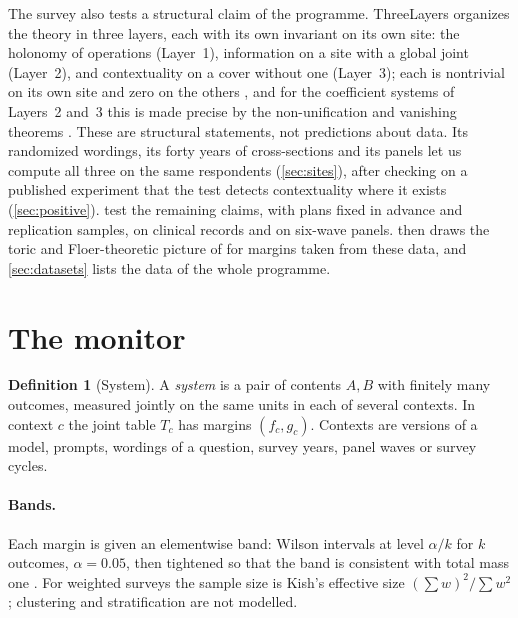 \documentclass[11pt]{article}
\theoremstyle{definition}
\newtheorem{definition}[theorem]{Definition}
\theoremstyle{remark}
\begin{document}
The survey also tests a structural claim of the programme. ThreeLayers \cite{ThreeLayers} organizes the theory in three layers, each with
its own invariant on its own site: the holonomy of operations (Layer~1), information on a site with a global joint (Layer~2), and
contextuality on a cover without one (Layer~3); each is nontrivial on its own site and zero on the others \cite[\S2]{ThreeLayers},
and for the coefficient systems of Layers~2 and~3 this is made precise by the non-unification and vanishing theorems
\cite[Thms.~15.1, 15.3]{ThreeLayers}. These are structural statements, not predictions about data. Its randomized wordings, its forty years of cross-sections and its panels let us compute all three
on the same respondents (\cref{sec:sites}), after checking on a published experiment that the test detects contextuality where it
exists (\cref{sec:positive}).  test the remaining claims, with plans fixed in advance and replication
samples, on clinical records and on six-wave panels.  then draws the toric and Floer-theoretic picture of \cite{Bridges} for
margins taken from these data, and \cref{sec:datasets} lists the data of the whole programme.

\section{The monitor}\label{sec:monitor}

\begin{definition}[System]
A \emph{system} is a pair of contents $A,B$ with finitely many outcomes, measured jointly on the same units in each of several contexts.
In context $c$ the joint table $T_c$ has margins $(f_c,g_c)$. Contexts are versions of a model, prompts, wordings of a question, survey
years, panel waves or survey cycles.
\end{definition}

\paragraph{Bands.} Each margin is given an elementwise band: Wilson intervals at level $\alpha/k$ for $k$ outcomes, $\alpha=0.05$,
then tightened so that the band is consistent with total mass one \cite[Prop.~2.2]{Bands}. For weighted surveys the sample size is
Kish's effective size $(\sum w)^2/\sum w^2$ \cite{Kish1965}; clustering and stratification are not modelled.
\end{document}
